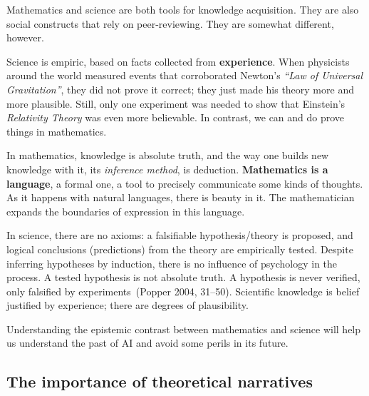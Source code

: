 \documentclass[
  letterpaper,
  12pt,
  british]{tufte-book}
\theoremstyle{plain}
\theoremstyle{definition}
\theoremstyle{plain}
\theoremstyle{remark}
\begin{document}
Mathematics and science are both tools for knowledge acquisition. They
are also social constructs that rely on peer-reviewing. They are
somewhat different, however.

Science is empiric, based on facts collected from \textbf{experience}.
When physicists around the world measured events that corroborated
Newton's \emph{``Law of Universal Gravitation''}, they did not prove it
correct; they just made his theory more and more plausible. Still, only
one experiment was needed to show that Einstein's \emph{Relativity
Theory} was even more believable. In contrast, we can and do prove
things in mathematics.

In mathematics, knowledge is absolute truth, and the way one builds new
knowledge with it, its \emph{inference method}, is deduction.
\textbf{Mathematics is a language}, a formal one, a tool to precisely
communicate some kinds of thoughts. As it happens with natural
languages, there is beauty in it. The mathematician expands the
boundaries of expression in this language.

In science, there are no axioms: a falsifiable hypothesis/theory is
proposed, and logical conclusions (predictions) from the theory are
empirically tested. Despite inferring hypotheses by induction, there is
no influence of psychology in the process. A tested hypothesis is not
absolute truth. A hypothesis is never verified, only falsified by
experiments~(Popper 2004,
31--50).
Scientific knowledge is belief justified by experience; there are
degrees of plausibility.

Understanding the epistemic contrast between mathematics and science
will help us understand the past of {AI} and avoid some perils in its
future.

\hypertarget{the-importance-of-theoretical-narratives}{%
\subsection{The importance of theoretical
narratives}\label{the-importance-of-theoretical-narratives}}
\end{document}

